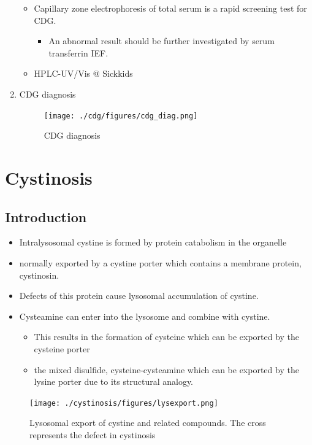 \documentclass{scrartcl}
\begin{document}
\begin{enumerate}
\begin{itemize}
\item Capillary zone electrophoresis of total serum is a rapid screening
test for CDG.
\begin{itemize}
\item An abnormal result should be further investigated by serum
transferrin IEF.
\end{itemize}

\item HPLC-UV/Vis @ Sickkids
\end{itemize}

\item CDG diagnosis
\label{sec:org9b6fc80}

\begin{figure}[htbp]
\centering
\texttt{[image: ./cdg/figures/cdg\_diag.png]}
\caption{\label{fig:org1654da2}
CDG diagnosis}
\end{figure}
\end{enumerate}
\section{Cystinosis}
\label{sec:orgd2c0143}
\subsection{Introduction}
\label{sec:org085a551}
\begin{itemize}
\item Intralysosomal cystine is formed by protein catabolism in the organelle
\item normally exported by a cystine porter which contains a membrane protein, cystinosin.
\item Defects of this protein cause lysosomal accumulation of cystine.
\item Cysteamine can enter into the lysosome and combine with cystine.
\begin{itemize}
\item This results in the formation of cysteine which can be exported by the cysteine porter
\item the mixed disulfide, cysteine-cysteamine which can be exported by the lysine porter due to its structural analogy.
\end{itemize}
\end{itemize}

\begin{figure}[htbp]
\centering
\texttt{[image: ./cystinosis/figures/lysexport.png]}
\caption{\label{fig:org802f582}
Lysosomal export of cystine and related compounds. The cross represents the defect in cystinosis}
\end{figure}
\end{document}
